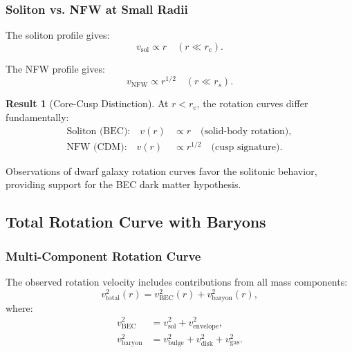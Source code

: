 \documentclass[11pt,a4paper]{article}
\newcommand{\rc}{\ensuremath{r_{\mathrm{c}}}}
\theoremstyle{definition}
\newtheorem{result}{Result}
\theoremstyle{remark}
\begin{document}
\subsubsection{Soliton vs. NFW at Small Radii}

The soliton profile gives:
\begin{equation}
v_{\mathrm{sol}} \propto r \quad (r \ll \rc).
\end{equation}

The NFW profile gives:
\begin{equation}
v_{\mathrm{NFW}} \propto r^{1/2} \quad (r \ll r_s).
\end{equation}

\begin{result}[Core-Cusp Distinction]
At $r < \rc$, the rotation curves differ fundamentally:
\begin{equation}
\boxed{
\begin{aligned}
\text{Soliton (BEC):} \quad v(r) &\propto r \quad \text{(solid-body rotation)}, \\
\text{NFW (CDM):} \quad v(r) &\propto r^{1/2} \quad \text{(cusp signature)}.
\end{aligned}
}
\end{equation}

Observations of dwarf galaxy rotation curves favor the solitonic behavior, providing support for the BEC dark matter hypothesis.
\end{result}

\subsection{Total Rotation Curve with Baryons}
\label{sec:total_rotation}

\subsubsection{Multi-Component Rotation Curve}

The observed rotation velocity includes contributions from all mass components:
\begin{equation}
\label{eq:vtotal}
\boxed{v_{\mathrm{total}}^2(r) = v_{\mathrm{BEC}}^2(r) + v_{\mathrm{baryon}}^2(r),}
\end{equation}
where:
\begin{align}
v_{\mathrm{BEC}}^2 &= v_{\mathrm{sol}}^2 + v_{\mathrm{envelope}}^2, \\
v_{\mathrm{baryon}}^2 &= v_{\mathrm{bulge}}^2 + v_{\mathrm{disk}}^2 + v_{\mathrm{gas}}^2.
\end{align}
\end{document}
